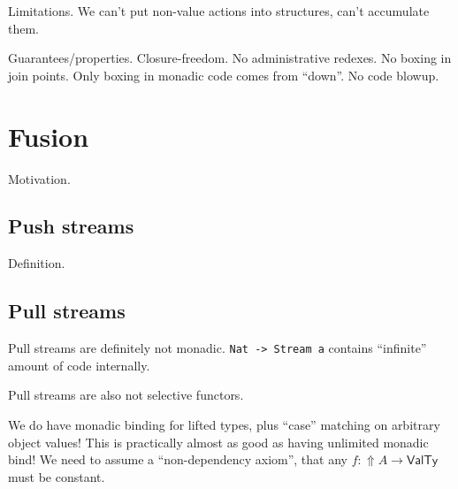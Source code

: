 \documentclass[acmsmall,screen,review,anonymous]{acmart}
\newcommand{\msf}[1]{\mathsf{#1}}
\newcommand{\Lift}{{\Uparrow}}
\begin{document}
Limitations. We can't put non-value actions into structures, can't accumulate them.

Guarantees/properties. Closure-freedom. No administrative redexes. No boxing in join points.
Only boxing in monadic code comes from ``down''. No code blowup.

\section{Fusion}\label{sec:push-pull-fusion}

Motivation.


\subsection{Push streams}\label{sec:push-streams}

Definition.

\subsection{Pull streams}\label{sec:pull-streams}

Pull streams are definitely not monadic. \texttt{Nat -> Stream a} contains
``infinite'' amount of code internally.

Pull streams are also not selective functors.

We do have monadic binding for lifted types, plus ``case'' matching
on arbitrary object values! This is practically almost as good as
having unlimited monadic bind! We need to assume a ``non-dependency axiom'',
that any $f : \Lift A \to \msf{ValTy}$ must be constant.



\end{document}
